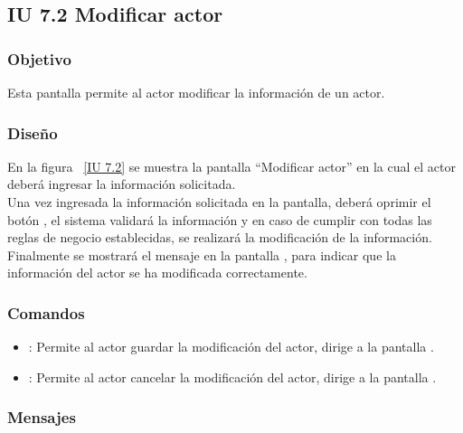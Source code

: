 \newpage 
\subsection{IU 7.2 Modificar actor}

\subsubsection{Objetivo}
	
	Esta pantalla permite al actor modificar la información de un actor.

\subsubsection{Diseño}

    En la figura ~\ref{IU 7.2} se muestra la pantalla ``Modificar actor'' en la cual el actor deberá ingresar la información solicitada. \\
    
    Una vez ingresada la información solicitada en la pantalla, deberá oprimir el botón , el sistema validará la información y en caso de cumplir con todas las reglas de negocio establecidas, se realizará la modificación de la información.\\
    
    Finalmente se mostrará el mensaje  en la pantalla , para indicar que la información del actor se ha modificada correctamente.        



\subsubsection{Comandos}
\begin{itemize}
	\item {}: Permite al actor guardar la modificación del actor, dirige a la pantalla .
	\item {}: Permite al actor cancelar la modificación del actor, dirige a la pantalla .
\end{itemize}

\subsubsection{Mensajes}
	
